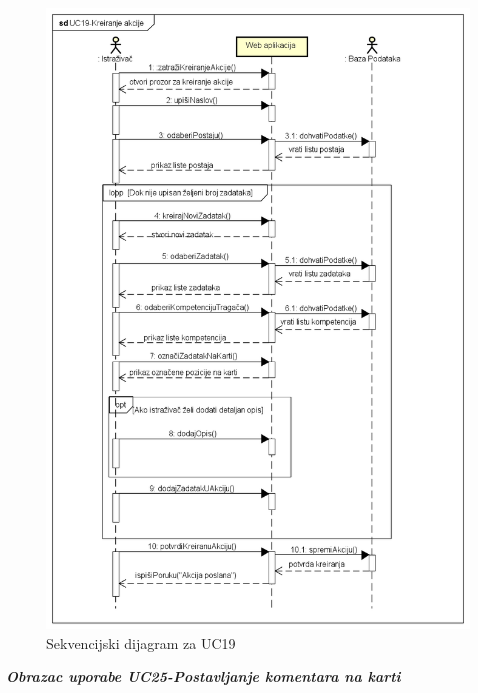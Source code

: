 				\begin{figure}[H]
					\includegraphics[width=\textwidth]{slike/UC19-KreiranjeAkcije} %
					\caption{Sekvencijski dijagram za UC19}
					\label{fig:promjene2} %
				\end{figure}
				\eject
				
	
				\textbf{\textit{Obrazac uporabe UC25-Postavljanje komentara na karti}}\\
				
